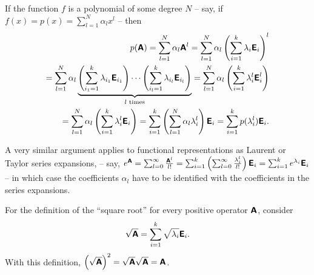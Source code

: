{
\color{blue}
\bexample
If the function $f$ is a polynomial of some degree $N$ -- say, if
$f (x) = p(x) = \sum_{l=1}^N \alpha_l x^l$ -- then
\begin{equation}
\begin{split}
p (\textsf{\textbf{A}})
= \sum_{l=1}^N \alpha_l \textsf{\textbf{A}}^l
= \sum_{l=1}^N \alpha_l \left(\sum_{i=1}^k  \lambda_i   \textsf{\textbf{E}}_i\right)^l \\
= \sum_{l=1}^N \alpha_l \underbrace{\left(\sum_{{i_1}=1}^k \lambda_{i_1}  \textsf{\textbf{E}}_{i_1}\right)   \cdots  \left(\sum_{{i_l}=1}^k \lambda_{i_l}  \textsf{\textbf{E}}_{i_l}\right)}_{l \text{ times}}
= \sum_{l=1}^N \alpha_l \left(\sum_{i=1}^k  \lambda_i^l   \textsf{\textbf{E}}_i^l\right)   \\
= \sum_{l=1}^N \alpha_l \left(\sum_{i=1}^k  \lambda_i^l   \textsf{\textbf{E}}_i\right)
= \sum_{i=1}^k    \left( \sum_{l=1}^N \alpha_l \lambda_i^l   \right)  \textsf{\textbf{E}}_i
= \sum_{i=1}^k p ( \lambda_i^l   ) \textsf{\textbf{E}}_i  .
\end{split}
\end{equation}

A very similar argument applies to functional representations as Laurent or Taylor series expansions,
 -- say, $e^\textsf{\textbf{A}} = \sum_{l=0}^\infty   \frac{\textsf{\textbf{A}}^l}{l!} = \sum_{i=1}^k  \left(   \sum_{l=0}^\infty \frac{\lambda_i^l}{l!}\right) \textsf{\textbf{E}}_i
= \sum_{i=1}^k  e^{\lambda_i} \textsf{\textbf{E}}_i $
-- in which case the coefficients $\alpha_l $ have to be identified with the coefficients in the  series expansions.



For the definition of the ``square root''
for every positive operator $\textsf{\textbf{A}}$, consider
\begin{equation}
\sqrt{\textsf{\textbf{A}}}=\sum_{i=1}^k \sqrt{\lambda_i}  \textsf{\textbf{E}}_i.
\end{equation}
With this definition,
$\left(\sqrt{\textsf{\textbf{A}}}\right)^2=
\sqrt{\textsf{\textbf{A}}}\sqrt{\textsf{\textbf{A}}}= {\textsf{\textbf{A}}}$.

}
